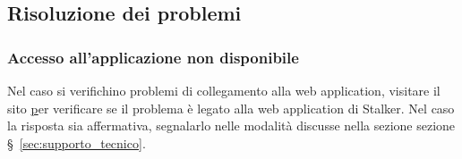 \documentclass[../manuale-utente.tex]{subfiles}
\begin{document}

\subsection{Risoluzione dei problemi}%
\label{subs:web_app_risoluzione_problemi}

\subsubsection{Accesso all'applicazione non disponibile}%
\label{subs:web_app_accesso_non_disponibile}

Nel caso si verifichino problemi di collegamento alla web application, visitare il sito \href{http://www.isitdownrightnow.com/} per verificare se il problema è legato alla web application di Stalker.
Nel caso la risposta sia affermativa, segnalarlo nelle modalità discusse nella sezione sezione §~\ref{sec:supporto_tecnico}.
\end{document}
